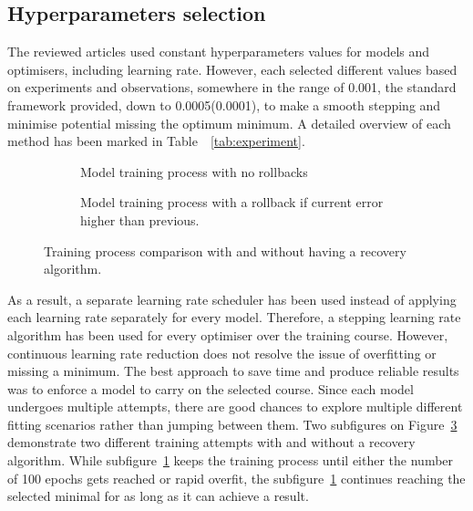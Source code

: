 \subsection{Hyperparameters selection} \label{subsec:l-rate}
%
The reviewed articles used constant hyperparameters values for models and optimisers, including learning rate.
However, each selected different values based on experiments and observations, somewhere in the range of 0.001, the standard framework provided, down to 0.0005(0.0001), to make a smooth stepping and minimise potential missing the optimum minimum.
A detailed overview of each method has been marked in \mbox{Table ~\ref{tab:experiment}}.

%
\begin{figure}[htbp]
  \centering
  \begin{subfigure}[b]{0.45\textwidth}
      \centering
      
      \caption{Model training process with no rollbacks}
      \label{subfig:no-rollback}
  \end{subfigure}
  \hfill
  \begin{subfigure}[b]{0.45\textwidth}
      \centering
      
      \caption{Model training process with a rollback if current error higher than previous.}
      \label{subfig:rollback}
  \end{subfigure}
  \caption{Training process comparison with and without having a recovery algorithm.}
  \label{fig:rollback}
\end{figure}
As a result, a separate learning rate scheduler has been used instead of applying each learning rate separately for every model.
Therefore, a stepping learning rate algorithm has been used for every optimiser over the training course.
However, continuous learning rate reduction does not resolve the issue of overfitting or missing a minimum.
The best approach to save time and produce reliable results was to enforce a model to carry on the selected course.
Since each model undergoes multiple attempts, there are good chances to explore multiple different fitting scenarios rather than jumping between them.
Two subfigures on \mbox{Figure~\ref{fig:rollback}} demonstrate two different training attempts with and without a recovery algorithm.
While subfigure~\ref{subfig:no-rollback} keeps the training process until either the number of 100 epochs gets reached or rapid overfit, the subfigure~\ref{subfig:no-rollback} continues reaching the selected minimal for as long as it can achieve a result.
